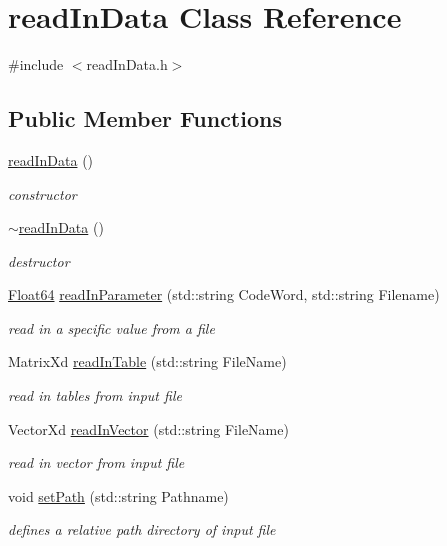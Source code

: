 \hypertarget{classread_in_data}{}\section{read\+In\+Data Class Reference}
\label{classread_in_data}


{\ttfamily \#include $<$read\+In\+Data.\+h$>$}

\subsection*{Public Member Functions}
\begin{DoxyCompactItemize}
\item 
\hyperlink{classread_in_data_adf5f563c9d967b1291c8a26c61b33c27}{read\+In\+Data} ()
\begin{DoxyCompactList}\small\item\em constructor \end{DoxyCompactList}\item 
\hyperlink{classread_in_data_af34d37cf1fb596bca7f1f9c1c97fd2eb}{$\sim$read\+In\+Data} ()
\begin{DoxyCompactList}\small\item\em destructor \end{DoxyCompactList}\item 
\hyperlink{group___tools_ga3f1431cb9f76da10f59246d1d743dc2c}{Float64} \hyperlink{classread_in_data_a9ae979e74958b43424cb6cf4a22043d7}{read\+In\+Parameter} (std\+::string Code\+Word, std\+::string Filename)
\begin{DoxyCompactList}\small\item\em read in a specific value from a file \end{DoxyCompactList}\item 
Matrix\+Xd \hyperlink{classread_in_data_af616573832efc2c27f07f5f6877b1386}{read\+In\+Table} (std\+::string File\+Name)
\begin{DoxyCompactList}\small\item\em read in tables from input file \end{DoxyCompactList}\item 
Vector\+Xd \hyperlink{classread_in_data_ab57aff38529234593d786ecace301cf7}{read\+In\+Vector} (std\+::string File\+Name)
\begin{DoxyCompactList}\small\item\em read in vector from input file \end{DoxyCompactList}\item 
void \hyperlink{classread_in_data_ad67d566fd837f6d721db279144d484e0}{set\+Path} (std\+::string Pathname)
\begin{DoxyCompactList}\small\item\em defines a relative path directory of input file \end{DoxyCompactList}\end{DoxyCompactItemize}


